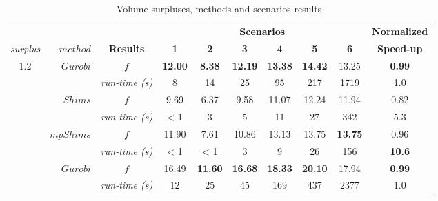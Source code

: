 \documentclass[preprint,authoryear]{elsarticle}
\begin{document}
\begin{table}[H]
\centering
\caption{Volume surpluses, methods and scenarios results}  \label{tab:results}
\footnotesize
\begin{tabular}{crcccccccc}
\toprule
&                          &                     &\multicolumn{6}{c}{\bf Scenarios}                                                                        &{\bf Normalized}\\
                                                 \cmidrule{4-9}		
{\it surplus}         & {$method$}               & {\bf Results}      &{\bf 1}      &{\bf 2}      &{\bf 3}      &{\bf 4}      &{\bf 5}       &{\bf 6}      &{\bf Speed-up} \\
\toprule


\multirow{7}{*}{$1.2$}&\multirow{2}{*}{ $Gurobi$}& $f$                & {\bf 12.00} & {\bf 8.38}  & {\bf 12.19} & {\bf 13.38} & {\bf 14.42} & 13.25        & {\bf 0.99} \\%
&                                                & {\it run-time (s)} &  8          &   14        &  25         &  95         &    217      &  1719        &  1.0       \\%

\cmidrule{2-10}		                       
&\multirow{2}{*}{ $Shims$}                       & $f$                & 9.69        &  6.37       &  9.58       &  11.07      &   12.24     & 11.94        &  0.82\\%
&                                                & {\it run-time (s)} &  < 1        &  3          &    5        &   11        &   27        & 342          &  5.3\\%

\cmidrule{2-10}		                       
&\multirow{2}{*}{ $mpShims$}                     & $f$                & 11.90       &  7.61       &  10.86      & 13.13       & 13.75       & {\bf 13.75}  &  0.96\\%
&                                                & {\it run-time (s)} &  < 1        &  < 1        &    3        &  9          &  26         & 156          &  {\bf 10.6}\\%

\midrule

\multirow{7}{*}{$1.5$}&\multirow{2}{*}{ $Gurobi$}& $f$                & 16.49       & {\bf 11.60} & {\bf 16.68} & {\bf 18.33} & {\bf 20.10} & 17.94        & {\bf 0.99}\\%
&                                                & {\it run-time (s)} &  12         &   25        &  45         &  169        &   437       &  2377        & 1.0\\%


\end{tabular}
\end{table}
\end{document}
